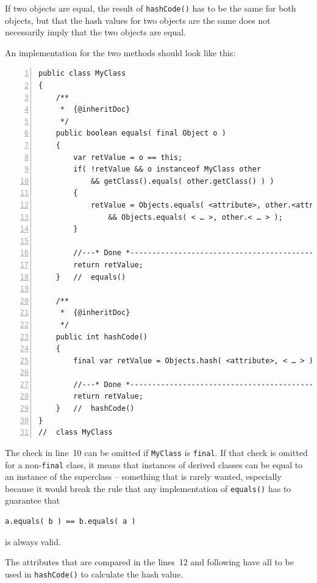 \documentclass[11pt,a4paper, titlepage, parskip=half, headsepline, footsepline, cleardoublepage=current, headheight=1cm]{scrbook}
\begin{document}
If two objects are equal, the result of \lstinline|hashCode()| has to be the same for both objects, but that the hash values for two objects are the same does not necessarily imply that the two objects are equal.

An implementation for the two methods should look like this:
\begin{lstlisting}[numbers=left,caption={Methods equals() and hashCode()}]
public class MyClass
{
    /**
     *  {@inheritDoc}
     */
    public boolean equals( final Object o )
    {
        var retValue = o == this;
        if( !retValue && o instanceof MyClass other
            && getClass().equals( other.getClass() ) )
        {
            retValue = Objects.equals( <attribute>, other.<attribute> )
                && Objects.equals( < … >, other.< … > );
        }
            
        //---* Done *------------------------------------------------
        return retValue;
    }   //  equals()
    
    /**
     *  {@inheritDoc}
     */
    public int hashCode()
    {
        final var retValue = Objects.hash( <attribute>, < … > );
        
        //---* Done *------------------------------------------------
        return retValue;
    }   //  hashCode()    
}
//  class MyClass
\end{lstlisting}
The check in line~10 can be omitted if \lstinline|MyClass| is \lstinline|final|. If that check is omitted for a non-\lstinline|final| class, it means that instances of derived classes can be equal to an instance of the superclass – something that is rarely wanted, especially because it would break the rule that any implementation of \lstinline|equals()| has to guarantee that
\begin{lstlisting}
a.equals( b ) == b.equals( a )
\end{lstlisting}
is always valid.

The attributes that are compared in the lines~12 and following have all to be used in \lstinline|hashCode()| to calculate the hash value.
\end{document}
